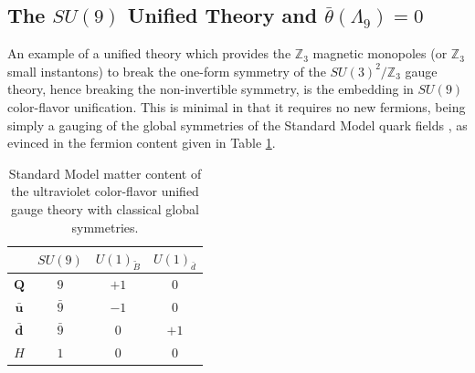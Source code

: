 \documentclass[11pt,a4paper]{article}
\begin{document}
\subsection{The \texorpdfstring{$SU(9)$}{SU(9)} Unified Theory and \texorpdfstring{$\bar \theta(\Lambda_{9})=0$}{theta = 0}} \label{sec:SU9theory}

An example of a unified theory which provides the $\mathbb{Z}_3$ magnetic monopoles (or $\mathbb{Z}_3$ small instantons) to break the one-form symmetry of the $SU(3)^2/\mathbb{Z}_3$ gauge theory, hence breaking the non-invertible symmetry, is the embedding in $SU(9)$ color-flavor unification. This is minimal in that it requires no new fermions, being simply a gauging of the global symmetries of the Standard Model quark fields \cite{Allanach:2021bfe}, as evinced in the fermion content given in Table \ref{tab:UVcharges}. 

\begin{table}[ht]\centering
\large
\renewcommand{\arraystretch}{1.3}
\begin{tabular}{|c|c|c|c|}  \hline
 & $SU(9)$ & $U(1)_{\tilde{B}}$ & $U(1)_{\bar d}$ \\ \hline


$\mathbf{Q}$ & $9$ & $+1$ & $0$ \\ \hline

$\mathbf{\bar u}$ & $\bar 9$ & $-1$ & $0$ \\ \hline

$\mathbf{\bar d}$ & $\bar 9$ & $0$ & $+1$ \\ \hline

$H$ & $1$ & $0$ & $0$ \\ \hline

\end{tabular}\caption{Standard Model matter content of the ultraviolet color-flavor unified gauge theory with classical global symmetries.}\label{tab:UVcharges}
\end{table}
\end{document}
